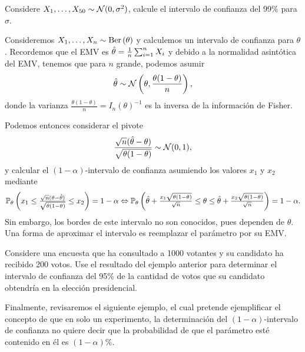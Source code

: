 \begin{exercise}
Considere $X_1,\ldots,X_{50}\sim{\mathcal N}(0,\sigma^2)$, calcule el intervalo de confianza del 99\% para $\sigma$.
\end{exercise}

\begin{example} Consideremos $X_1,\ldots,X_{n}\sim\text{Ber}\left(\theta\right)$ y calculemos un intervalo de confianza para $\theta$. Recordemos que el EMV es ${\hat\theta} = \frac{1}{n}\sum_{i=1}^nX_i$ y debido a la normalidad asintótica del EMV, tenemos que para $n$ grande, podemos asumir 
\begin{equation}
	{\hat\theta}\sim{\mathcal N}\left(\theta,\frac{\theta(1-\theta)}{n}\right),
\end{equation}
donde la varianza $\frac{\theta(1-\theta)}{n}=I_n(\theta)^{-1}$ es la inversa de la información de Fisher. 

Podemos entonces considerar el pivote
\begin{equation}
	\frac{\sqrt{n}({\hat\theta}-\theta)}{\sqrt{\theta(1-\theta)}}\sim{\mathcal N}(0,1),
\end{equation}
y calcular el $(1-\alpha)$-intervalo de confianza asumiendo los valores $x_1$ y $x_2$ mediante 
\begin{align*}
	\mathbb{P}_\theta \left(x_1 \leq \tfrac{\sqrt{n}(\theta-{\hat\theta})}{\sqrt{\theta(1-\theta)}} \leq x_2\right) = 1-\alpha \Leftrightarrow \mathbb{P}_\theta \left({\hat\theta} + \tfrac{x_1\sqrt{\theta(1-\theta)}}{\sqrt{n}} \leq \theta \leq {\hat\theta} + \tfrac{x_2\sqrt{\theta(1-\theta)}}{\sqrt{n}}\right) = 1-\alpha.
\end{align*}
Sin embargo, los bordes de este intervalo no son conocidos, pues dependen de $\theta$. Una forma de aproximar el intervalo es reemplazar el parámetro por su EMV. 
\end{example}


\begin{exercise} Considere una encuesta que ha consultado a 1000 votantes y su candidato ha recibido 200 votos. Use el resultado del ejemplo anterior para determinar el intervalo de confianza del 95\% de la cantidad de votos que su candidato obtendría en la elección presidencial. 
\end{exercise}

Finalmente, revisaremos el siguiente ejemplo, el cual pretende ejemplificar el concepto de que en solo un experimento, la determinación del $(1-\alpha)$-intervalo de confianza no quiere decir que la probabilidad de que el parámetro esté contenido en él es $(1-\alpha)$\%. 

